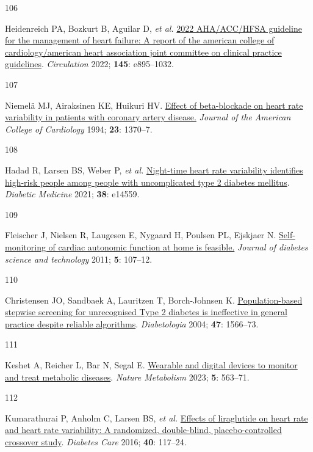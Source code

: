 \documentclass[
  a4paper,
  headsepline=true,
  open=any]{scrbook}
\newlength{\cslhangindent}
\newlength{\csllabelwidth}
\newlength{\cslentryspacingunit} %
\newenvironment{CSLReferences}[2] %
 {%
  \setlength{\parindent}{0pt}
  \ifodd #1
  \let\oldpar\par
  \def\par{\hangindent=\cslhangindent\oldpar}
  \fi
  \setlength{\parskip}{#2\cslentryspacingunit}
 }%
 {}
\newcommand{\CSLLeftMargin}[1]{\parbox[t]{\csllabelwidth}{#1}}
\newcommand{\CSLRightInline}[1]{\parbox[t]{\linewidth - \csllabelwidth}{#1}\break}
\begin{document}
\begin{CSLReferences}{0}{0}
\leavevmode{}%
\CSLLeftMargin{106 }%
\CSLRightInline{Heidenreich PA, Bozkurt B, Aguilar D, \emph{et al.}
\href{https://doi.org/10.1161/CIR.0000000000001063}{2022 AHA/ACC/HFSA
guideline for the management of heart failure: A report of the american
college of cardiology/american heart association joint committee on
clinical practice guidelines}. \emph{Circulation} 2022; \textbf{145}:
e895--1032.}

\leavevmode{}%
\CSLLeftMargin{107 }%
\CSLRightInline{Niemelä MJ, Airaksinen KE, Huikuri HV.
\href{https://doi.org/10.1016/0735-1097(94)90379-4}{Effect of
beta-blockade on heart rate variability in patients with coronary artery
disease.} \emph{Journal of the American College of Cardiology} 1994;
\textbf{23}: 1370--7.}

\leavevmode{}%
\CSLLeftMargin{108 }%
\CSLRightInline{Hadad R, Larsen BS, Weber P, \emph{et al.}
\href{https://doi.org/10.1111/dme.14559}{Night-time heart rate
variability identifies high-risk people among people with uncomplicated
type 2 diabetes mellitus}. \emph{Diabetic Medicine} 2021; \textbf{38}:
e14559.}

\leavevmode{}%
\CSLLeftMargin{109 }%
\CSLRightInline{Fleischer J, Nielsen R, Laugesen E, Nygaard H, Poulsen
PL, Ejskjaer N.
\href{https://doi.org/10.1177/193229681100500115}{Self-monitoring of
cardiac autonomic function at home is feasible.} \emph{Journal of
diabetes science and technology} 2011; \textbf{5}: 107--12.}

\leavevmode{}%
\CSLLeftMargin{110 }%
\CSLRightInline{Christensen JO, Sandbaek A, Lauritzen T, Borch-Johnsen
K. \href{https://doi.org/10.1007/s00125-004-1496-2}{Population-based
stepwise screening for unrecognised Type 2 diabetes is ineffective in
general practice despite reliable algorithms}. \emph{Diabetologia} 2004;
\textbf{47}: 1566--73.}

\leavevmode{}%
\CSLLeftMargin{111 }%
\CSLRightInline{Keshet A, Reicher L, Bar N, Segal E.
\href{https://doi.org/10.1038/s42255-023-00778-y}{Wearable and digital
devices to monitor and treat metabolic diseases}. \emph{Nature
Metabolism} 2023; \textbf{5}: 563--71.}

\leavevmode{}%
\CSLLeftMargin{112 }%
\CSLRightInline{Kumarathurai P, Anholm C, Larsen BS, \emph{et al.}
\href{https://doi.org/10.2337/dc16-1580}{Effects of liraglutide on heart
rate and heart rate variability: A randomized, double-blind,
placebo-controlled crossover study}. \emph{Diabetes Care} 2016;
\textbf{40}: 117--24.}


\end{CSLReferences}
\end{document}
